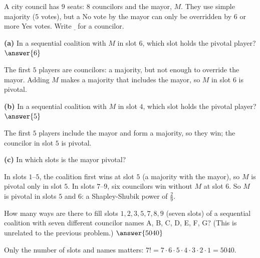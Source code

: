\documentclass[12pt]{ximera}
\begin{document}
\begin{problem}
A city council has $9$ seats: $8$ councilors and the mayor, $M$. They use simple majority ($5$ votes), but a No vote by the mayor can only be overridden by $6$ or more Yes votes. Write
$\underline{\ }$ for a councilor.

\begin{prompt}
\textbf{(a)} In a sequential coalition with $M$ in slot $6$, which slot holds the
pivotal player? $\answer{6}$
\begin{feedback}
The first $5$ players are councilors: a majority, but not enough to override the mayor. Adding $M$ makes a majority that includes the mayor, so $M$ in slot $6$ is pivotal.
\end{feedback}
\end{prompt}

\begin{prompt}
\textbf{(b)} In a sequential coalition with $M$ in slot $4$, which slot
holds the pivotal player? $\answer{5}$
\begin{feedback}
The first $5$ players include the mayor and form a majority, so they win; the councilor in slot $5$ is pivotal.
\end{feedback}
\end{prompt}

\begin{prompt}
\textbf{(c)} In which slots is the mayor pivotal?
\begin{selectAll}
\end{selectAll}
\begin{feedback}
In slots $1$--$5$, the coalition first wins at slot $5$ (a majority with the mayor), so $M$ is pivotal only in slot $5$. In slots $7$--$9$, six councilors win without $M$ at slot $6$. So $M$ is pivotal in slots $5$ and $6$: a Shapley-Shubik power of $\frac29$.
\end{feedback}
\end{prompt}
\end{problem}

\begin{problem}
How many ways are there to fill slots $1,2,3,5,7,8,9$ (seven slots) of a sequential coalition
with seven different councilor names A, B, C, D, E, F, G? (This is unrelated to the
previous problem.) $\answer{5040}$
\begin{feedback}
Only the number of slots and names matters: $7!=7\cdot6\cdot5\cdot4\cdot3\cdot2\cdot1=5040$.
\end{feedback}
\end{problem}
\end{document}
